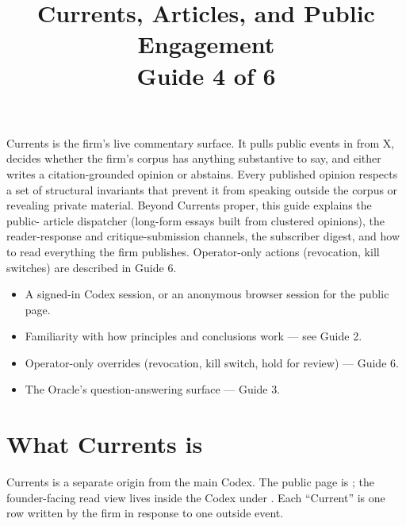 \documentclass[11pt]{article}
\title{\sffamily\bfseries Currents, Articles, and Public Engagement\\[2pt]\large Guide 4 of 6}
\date{}
\author{}
\begin{document}
\maketitle
\thispagestyle{empty}

\begin{tldr}
Currents is the firm's live commentary surface. It pulls public events
in from X, decides whether the firm's corpus has anything substantive
to say, and either writes a citation-grounded opinion or abstains.
Every published opinion respects a set of structural invariants that
prevent it from speaking outside the corpus or revealing private
material. Beyond Currents proper, this guide explains the public-
article dispatcher (long-form essays built from clustered opinions),
the reader-response and critique-submission channels, the subscriber
digest, and how to read everything the firm publishes. Operator-only
actions (revocation, kill switches) are described in Guide 6.
\end{tldr}

\begin{youwillneed}
\begin{itemize}[leftmargin=*,itemsep=0.2em,topsep=0.2em]
  \item A signed-in Codex session, or an anonymous browser session
        for the public  page.
  \item Familiarity with how principles and conclusions work --- see
        Guide 2.
\end{itemize}
\end{youwillneed}

\begin{notcovered}
\begin{itemize}[leftmargin=*,itemsep=0.2em,topsep=0.2em]
  \item Operator-only overrides (revocation, kill switch, hold for
        review) --- Guide 6.
  \item The Oracle's question-answering surface --- Guide 3.
\end{itemize}
\end{notcovered}

\section{What Currents is}

Currents is a separate origin from the main Codex. The public page is
; the founder-facing read view lives inside the Codex
under . Each ``Current'' is one
 row written by the firm in response to one outside
event.
\end{document}

